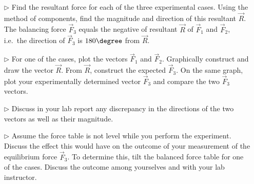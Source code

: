 \begin{itemize}
\item[$\triangleright$] Find the resultant force for each of the three experimental cases. Using the method of components, find the magnitude and direction of this resultant $\vec{R}$.  The balancing force $\vec{F}_{3}$ equals the negative of resultant $\vec{R}$ of $ \vec{F}_{1}$ and $\vec{F}_{2}$, i.e.\ the direction of $\vec{F}_{3}$ is $180\degree$ from $\vec{R}$.
\item[$\triangleright$] For one of the cases, plot the vectors $\vec{F}_{1}$ and $\vec{F}_{2}$.  Graphically construct and draw the vector $\vec{R}$.  From $\vec{R}$, construct the expected $\vec{F}_{3}$.  On the same graph, plot your experimentally determined vector $\vec{F}_{3}$ and compare the two $\vec{F}_{3}$ vectors.
\item[$\triangleright$] Discuss in your lab report any discrepancy in the directions of the two vectors as well as their magnitude.
\item[$\triangleright$] Assume the force table is not level while you perform the experiment. Discuss the effect this would have on the outcome of your measurement of the equilibrium force $\vec{F}_{3}$. To determine this, tilt the balanced force table for one of the cases. Discuss the outcome among yourselves and with your lab instructor.
\end{itemize}

